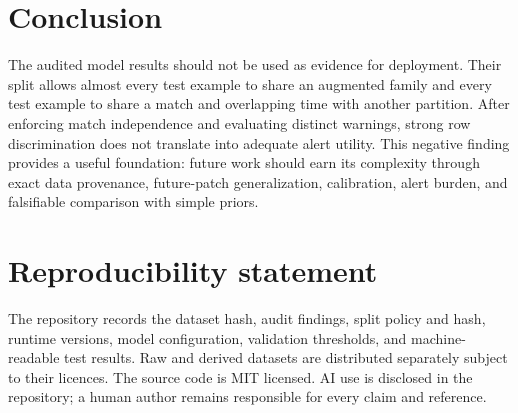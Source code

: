 \documentclass[10pt]{article}
\begin{document}
\section{Conclusion}

The audited model results should not be used as evidence for deployment. Their
split allows almost every test example to share an augmented family and every
test example to share a match and overlapping time with another partition.
After enforcing match independence and evaluating distinct warnings, strong
row discrimination does not translate into adequate alert utility. This
negative finding provides a useful foundation: future work should earn its
complexity through exact data provenance, future-patch generalization,
calibration, alert burden, and falsifiable comparison with simple priors.

\section*{Reproducibility statement}

The repository records the dataset hash, audit findings, split policy and hash,
runtime versions, model configuration, validation thresholds, and
machine-readable test results. Raw and derived datasets are distributed
separately subject to their licences. The source code is MIT licensed. AI use
is disclosed in the repository; a human author remains responsible for every
claim and reference.



\end{document}
